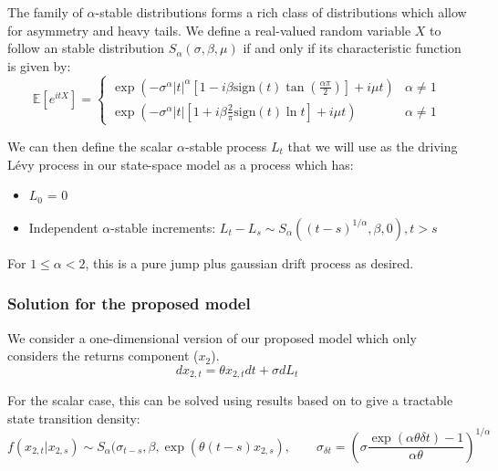 \documentclass[../main.tex]{subfiles}
\begin{document}
The family of $\alpha$-stable distributions forms a rich class of distributions which allow for asymmetry and heavy tails. We define a real-valued random variable $X$ to follow an stable distribution $S_\alpha(\sigma, \beta, \mu)$ if and only if its characteristic function is given by:
\begin{equation}
    \mathbb{E} [e^{itX}]  = \begin{cases} 
    \exp{( -\sigma^\alpha |t|^\alpha [1-i\beta \text{sign}(t)\tan(\frac{\alpha\pi}{2})] + i\mu t )} & \alpha \neq 1 \\
    \exp{( -\sigma^\alpha |t| [1+i\beta \frac{2}{\pi}\text{sign}(t) \ln{t}] + i\mu t)} & \alpha \neq 1
    \end{cases}
\end{equation}

We can then define the scalar $\alpha$-stable process $L_t$ that we will use as the driving Lévy process in our state-space model as a process which has:

\begin{itemize}
    \itemsep0em 
    \item $L_0$ = 0
    \item Independent $\alpha$-stable increments: $L_t - L_s \sim S_\alpha( (t-s)^{1/\alpha}, \beta, 0), t > s$
\end{itemize}

For $1 \leq \alpha < 2$, this is a pure jump plus gaussian drift process as desired. 

\subsubsection{Solution for the proposed model}

We consider a one-dimensional version of our proposed model which only considers the returns component ($x_2$).
\begin{equation}
    dx_{2,t} = \theta x_{2,t} dt + \sigma dL_t
    \label{eq:2__1__single_dim_model}
\end{equation}

For the scalar case, this can be solved using results based on \cite{samoradnitsky2017stable} to give a tractable state transition density: 
\begin{equation}
    f(x_{2,t} | x_{2,s}) \sim S_\alpha( \sigma_{t-s}, \beta, \exp ( \theta(t-s) x_{2,s}),    \qquad  \sigma_{\delta t} = \left( \sigma \frac{\exp(\alpha \theta \delta t) - 1 }{\alpha \theta}\right)^{1/\alpha}
    \label{eq:2__1__state_transition_density}
\end{equation}
\end{document}
